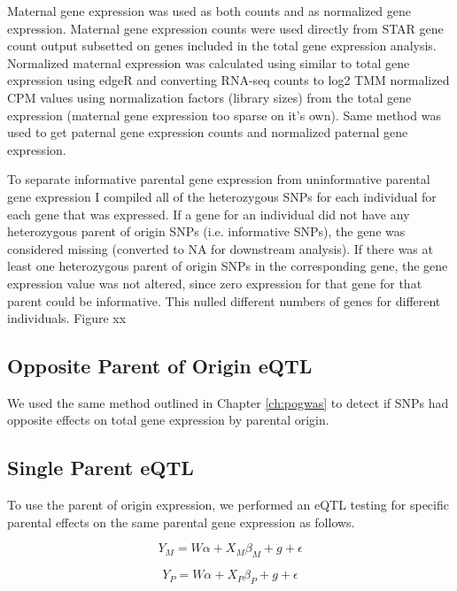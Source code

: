 Maternal gene expression was used as both counts and as normalized gene expression. Maternal gene expression counts were used directly from STAR gene count output\cite{Dobin:2002by} subsetted on genes included in the total gene expression analysis. 
Normalized maternal expression was calculated using similar to total gene expression using edgeR and converting RNA-seq counts to log2 TMM normalized CPM values using normalization factors (library sizes) from the total gene expression (maternal gene expression too sparse on it's own). 
Same method was used to get paternal gene expression counts and normalized paternal gene expression.

To separate informative parental gene expression from uninformative parental gene expression I compiled all of the heterozygous SNPs for each individual for each gene that was expressed. If a gene for an individual did not have any heterozygous parent of origin SNPs (i.e. informative SNPs), the gene was considered missing (converted to NA for downstream analysis). If there was at least one heterozygous parent of origin SNPs in the corresponding gene, the gene expression value was not altered, since zero expression for that gene for that parent could be informative. This nulled different numbers of genes for different individuals. Figure xx


\subsection{Opposite Parent of Origin eQTL}\label{Opposite Parent of Origin eQTL}
We used the same method outlined in Chapter \ref{ch:pogwas} to detect if SNPs had opposite effects on total gene expression by parental origin. 

\subsection{Single Parent eQTL}\label{Single Parent eQTL}
To use the parent of origin expression, we performed an eQTL testing for specific parental effects on the same parental gene expression as follows. 

\begin{equation}
Y _{M}=W\alpha + X_{M}\beta_{M}+g+\epsilon
\end{equation}

\begin{equation}
Y _{P}=W\alpha + X_{P}\beta_{P}+g+\epsilon
\end{equation}






